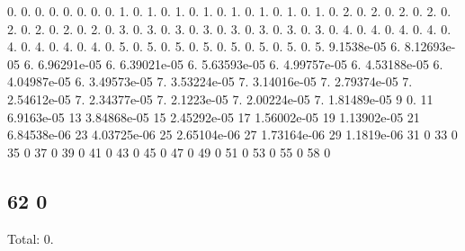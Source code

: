 0. 0. 0. 0. 0. 0. 0. 0. 1. 0. 1. 0. 1. 0. 1. 0. 1. 0. 1. 0. 1. 0. 1. 0. 2. 0. 2. 0. 2. 0. 2. 0. 2. 0. 2. 0. 2. 0. 2. 0. 3. 0. 3. 0. 3. 0. 3. 0. 3. 0. 3. 0. 3. 0. 3. 0. 4. 0. 4. 0. 4. 0. 4. 0. 4. 0. 4. 0. 4. 0. 4. 0. 5. 0. 5. 0. 5. 0. 5. 0. 5. 0. 5. 0. 5. 0. 5. 9.\+1538e-\/05 6. 8.\+12693e-\/05 6. 6.\+96291e-\/05 6. 6.\+39021e-\/05 6. 5.\+63593e-\/05 6. 4.\+99757e-\/05 6. 4.\+53188e-\/05 6. 4.\+04987e-\/05 6. 3.\+49573e-\/05 7. 3.\+53224e-\/05 7. 3.\+14016e-\/05 7. 2.\+79374e-\/05 7. 2.\+54612e-\/05 7. 2.\+34377e-\/05 7. 2.\+1223e-\/05 7. 2.\+00224e-\/05 7. 1.\+81489e-\/05 9 0. 11 6.\+9163e-\/05 13 3.\+84868e-\/05 15 2.\+45292e-\/05 17 1.\+56002e-\/05 19 1.\+13902e-\/05 21 6.\+84538e-\/06 23 4.\+03725e-\/06 25 2.\+65104e-\/06 27 1.\+73164e-\/06 29 1.\+1819e-\/06 31 0 33 0 35 0 37 0 39 0 41 0 43 0 45 0 47 0 49 0 51 0 53 0 55 0 58 0 \subsection*{62 0 }

Total\+: 0. 